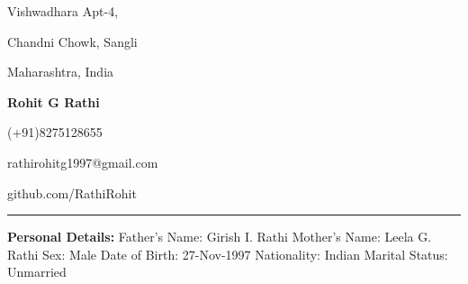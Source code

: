 \documentclass[11pt]{article}
\begin{document}
	\begin{center}
		\begin{minipage}[b]{0.33333\textwidth}
			\raggedright
			Vishwadhara Apt-4,\par
			Chandni Chowk, Sangli\par
			Maharashtra, India
		\end{minipage}%
		\begin{minipage}[b]{0.33333\textwidth}
			\centering
			\begin{huge}
				\textbf{Rohit G Rathi}		
			\end{huge}
		\end{minipage}%
		\begin{minipage}[b]{0.33333\textwidth}
			\raggedleft
			(+91)8275128655\par
			rathirohitg1997@gmail.com\par
			github.com/RathiRohit\par
		\end{minipage}%
		\bigskip
		\hrule
		\bigskip
		\smallskip
		\begin{minipage}[t]{0.3\textwidth}
			\raggedright\smallskip
			\begin{LARGE}
				\textbf{Personal Details:}\medskip\linebreak%
				{\small Father's Name: Girish I. Rathi}\linebreak%
				{\small Mother's Name: Leela G. Rathi}\linebreak%
				{\small Sex: Male}\linebreak%
				{\small Date of Birth: 27-Nov-1997}\linebreak%
				{\small Nationality: Indian}\linebreak%
				{\small Marital Status: Unmarried}\linebreak%
			\end{LARGE}
		\end{minipage}%
		\begin{minipage}[t]{0.4\textwidth}
			\centering
			\strut\vspace*{-\baselineskip}\newline
			\setlength{\fboxsep}{4pt}%
			\setlength{\fboxrule}{1pt}%

\end{minipage}
\end{center}
\end{document}
